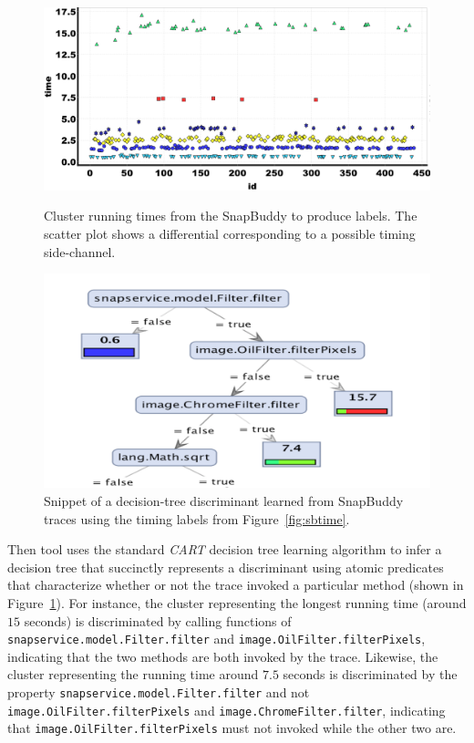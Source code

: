 \documentclass{article}
\begin{document}
\begin{figure}[t]
\centering
\begin{minipage}[b]{0.47\textwidth}
  \centering
  \includegraphics[width=\textwidth]{SnapBuddy_scatter_2}
  \caption{Cluster running times from the SnapBuddy to produce labels. The scatter plot shows a differential corresponding to a possible timing side-channel.}
  \label{fig:sbtime}
\end{minipage}\hfill
\begin{minipage}[b]{0.50\textwidth}
  \centering
  \includegraphics[width=\textwidth]{SnapBuddy_DecisionTree_1}
  \caption{Snippet of a decision-tree discriminant learned from SnapBuddy traces using the timing labels from Figure~\ref{fig:sbtime}.}
  \label{fig:sbdectree}
\end{minipage}
\vspace{-2em}
\end{figure}

Then tool uses the
standard \emph{CART} decision tree learning
algorithm to infer a decision tree that
succinctly represents a discriminant
using atomic predicates that characterize
whether or not the trace invoked a particular method (shown in Figure~\ref{fig:sbdectree}).
For instance, the cluster representing the longest running time (around $15$ seconds) is
discriminated by calling functions of \texttt{snapservice.model.Filter.filter} and 
\texttt{image.OilFilter.filterPixels}, indicating that the two methods
are both invoked by the trace. Likewise, the cluster representing the
running time around $7.5$ seconds is discriminated by the
property \texttt{snapservice.model.Filter.filter} and
not \texttt{image.OilFilter.filterPixels} and
\texttt{image.ChromeFilter.filter}, indicating that
\texttt{image.OilFilter.filterPixels} must not invoked
while the other two are.
\end{document}
